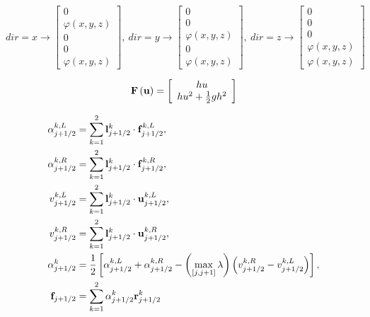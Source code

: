 \documentclass{article}
\begin{document}
\begin{equation} dir = x \rightarrow \left[\begin{array}{c}0 \\ \varphi\left(x,y,z\right) \\ 0 \\ 0 \\ \varphi\left(x,y,z\right) \end{array}\right], \ dir = y \rightarrow \left[\begin{array}{c}0 \\ 0 \\ \varphi\left(x,y,z\right) \\ 0 \\ \varphi\left(x,y,z\right) \end{array}\right], \ dir = z \rightarrow \left[\begin{array}{c}0 \\ 0 \\ 0 \\ \varphi\left(x,y,z\right) \\ \varphi\left(x,y,z\right) \end{array}\right] \end{equation}
\pagebreak

\begin{equation} {\bf F}\left({\bf u}\right) = \left[\begin{array}{c} hu \\ hu^2 + \frac{1}{2} gh^2 \end{array}\right] \end{equation}
\pagebreak

\begin{align} \alpha_{j+1/2}^{k,L} &= \sum_{k=1}^2 {\bf l}_{j+1/2}^k \cdot {\bf f}_{j+1/2}^{k,L}, \\ \alpha_{j+1/2}^{k,R} &= \sum_{k=1}^2 {\bf l}_{j+1/2}^k \cdot {\bf f}_{j+1/2}^{k,R}, \\ v_{j+1/2}^{k,L} &= \sum_{k=1}^2 {\bf l}_{j+1/2}^k \cdot {\bf u}_{j+1/2}^{k,L}, \\ v_{j+1/2}^{k,R} &= \sum_{k=1}^2 {\bf l}_{j+1/2}^k \cdot {\bf u}_{j+1/2}^{k,R}, \\ \alpha_{j+1/2}^k &= \frac{1}{2}\left[ \alpha_{j+1/2}^{k,L} + \alpha_{j+1/2}^{k,R} - \left(\max_{\left[j,j+1\right]} \lambda\right) \left( v_{j+1/2}^{k,R} - v_{j+1/2}^{k,L} \right) \right], \\ {\bf f}_{j+1/2} &= \sum_{k=1}^2 \alpha_{j+1/2}^k {\bf r}_{j+1/2}^k \end{align}
\pagebreak
\end{document}

